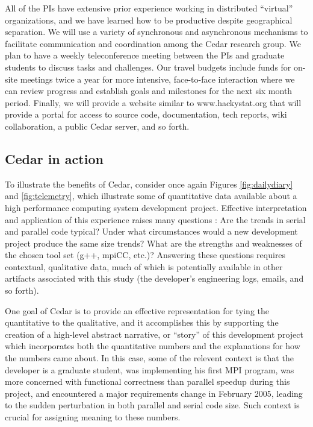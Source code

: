 All of the PIs have extensive prior experience working in distributed
``virtual'' organizations, and we have learned how to be productive despite
geographical separation.  We will use a variety of synchronous and
asynchronous mechanisms to facilitate communication and coordination among
the Cedar research group. We plan to have a weekly teleconference meeting
between the PIs and graduate students to discuss tasks and challenges. Our
travel budgets include funds for on-site meetings twice a year for more
intensive, face-to-face interaction where we can review progress and
establish goals and milestones for the next six month period.  Finally, we
will provide a website similar to www.hackystat.org that will provide a
portal for access to source code, documentation, tech reports, wiki
collaboration, a public Cedar server, and so forth.

\subsection{Cedar in action}

To illustrate the benefits of Cedar, consider once again Figures
\ref{fig:dailydiary} and \ref{fig:telemetry}, which illustrate some of
quantitative data available about a high performance computing system
development project.  Effective interpretation and application of this
experience raises many questions : Are the trends in serial and parallel
code typical? Under what circumstances would a new development project
produce the same size trends? What are the strengths and weaknesses of the
chosen tool set (g++, mpiCC, etc.)?  Answering these questions requires
contextual, qualitative data, much of which is potentially available in
other artifacts associated with this study (the developer's engineering
logs, emails, and so forth).

One goal of Cedar is to provide an effective representation for tying the
quantitative to the qualitative, and it accomplishes this by supporting the
creation of a high-level abstract narrative, or ``story'' of this
development project which incorporates both the quantitative numbers and
the explanations for how the numbers came about.  In this case, some of the
relevent context is that the developer is a graduate student, was
implementing his first MPI program, was more concerned with functional
correctness than parallel speedup during this project, and encountered a
major requirements change in February 2005, leading to the sudden
perturbation in both parallel and serial code size. Such context is crucial
for assigning meaning to these numbers.

